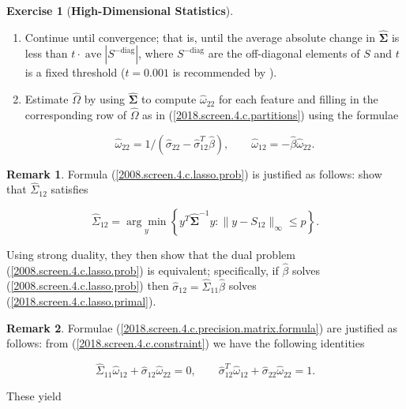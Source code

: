 \documentclass{article}
\theoremstyle{definition}
\newtheorem{exercise}{Exercise}
\newtheorem*{remark}{Remark}
\theoremstyle{definition}
\theoremstyle{definition}
\theoremstyle{definition}
\theoremstyle{definition}
\begin{document}
\begin{exercise}[\textbf{High-Dimensional Statistics}]
\begin{enumerate}[(a)]
\begin{enumerate}[1.]
\item Continue until convergence; that is, until the average absolute change in \(\boldsymbol{\hat{\Sigma}}\) is less than \(t \cdot \operatorname{ave} | S^{- \text{diag}} |\), where \( S^{- \text{diag}}\) are the off-diagonal elements of \(S\) and \(t\) is a fixed threshold (\(t = 0.001\) is recommended by \citet{Friedman2008}).

\item Estimate \(\hat{\Omega}\) by using \(\boldsymbol{\hat{\Sigma}}\) to compute \(\hat{\omega}_{22}\) for each feature and filling in the corresponding row of \(\hat{\Omega}\) as in (\ref{2018.screen.4.c.partitions}) using the formulae

\begin{equation}\label{2018.screen.4.c.precision.matrix.formula}
\hat{\omega}_{22} = 1/ \left( \hat{\sigma}_{22} - \hat{\sigma}_{12}^T \hat{\beta}\right), \qquad \hat{\omega}_{12} = - \hat{\beta}\hat{\omega}_{22}.
\end{equation}

\end{enumerate}


\begin{remark}
Formula (\ref{2008.screen.4.c.lasso.prob}) is justified as follows: \citet{Banerjee2008} show that \(\hat{\Sigma}_{12}\) satisfies

\begin{equation}\label{2018.screen.4.c.lasso.primal}
\hat{\Sigma}_{12} = \underset{y}{\arg \min} \left\{y^T \boldsymbol{\hat{\Sigma}}^{-1}y: \lVert y - S_{12} \rVert_\infty \leq p \right\}.
\end{equation}

Using strong duality, they then show that the dual problem (\ref{2008.screen.4.c.lasso.prob}) is equivalent; specifically, if \(\hat{\beta}\) solves (\ref{2008.screen.4.c.lasso.prob}) then \(\hat{\sigma}_{12} = \hat{\Sigma}_{11}\hat{\beta}\) solves (\ref{2018.screen.4.c.lasso.primal}).
\end{remark}

\begin{remark}
Formulae (\ref{2018.screen.4.c.precision.matrix.formula}) are justified as follows: from (\ref{2018.screen.4.c.constraint}) we have the following identities

\[
\hat{\Sigma}_{11} \hat{\omega}_{12} + \hat{\sigma}_{12} \hat{\omega}_{22} = 0, \qquad \hat{\sigma}_{12}^T \hat{\omega}_{12} + \hat{\sigma}_{22} \hat{\omega}_{22} = 1.
\]

These yield


\end{remark}
\end{enumerate}
\end{exercise}
\end{document}
